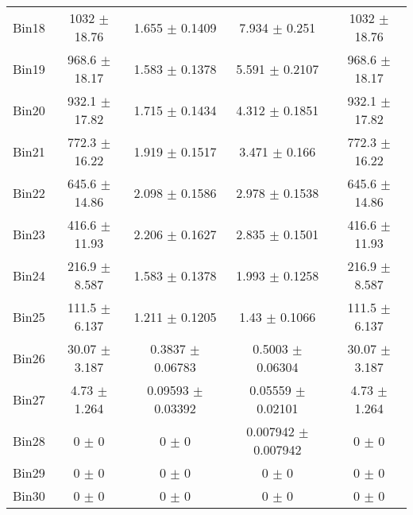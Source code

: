 \begin{tabular}{@{\extracolsep{4pt}}lcccc@{}}
     Bin18 & 1032 $\pm$ 18.76 & 1.655 $\pm$ 0.1409 & 7.934 $\pm$ 0.251 & 1032 $\pm$ 18.76 \\ 
     Bin19 & 968.6 $\pm$ 18.17 & 1.583 $\pm$ 0.1378 & 5.591 $\pm$ 0.2107 & 968.6 $\pm$ 18.17 \\ 
     Bin20 & 932.1 $\pm$ 17.82 & 1.715 $\pm$ 0.1434 & 4.312 $\pm$ 0.1851 & 932.1 $\pm$ 17.82 \\ 
     Bin21 & 772.3 $\pm$ 16.22 & 1.919 $\pm$ 0.1517 & 3.471 $\pm$ 0.166 & 772.3 $\pm$ 16.22 \\ 
     Bin22 & 645.6 $\pm$ 14.86 & 2.098 $\pm$ 0.1586 & 2.978 $\pm$ 0.1538 & 645.6 $\pm$ 14.86 \\ 
     Bin23 & 416.6 $\pm$ 11.93 & 2.206 $\pm$ 0.1627 & 2.835 $\pm$ 0.1501 & 416.6 $\pm$ 11.93 \\ 
     Bin24 & 216.9 $\pm$ 8.587 & 1.583 $\pm$ 0.1378 & 1.993 $\pm$ 0.1258 & 216.9 $\pm$ 8.587 \\ 
     Bin25 & 111.5 $\pm$ 6.137 & 1.211 $\pm$ 0.1205 & 1.43 $\pm$ 0.1066 & 111.5 $\pm$ 6.137 \\ 
     Bin26 & 30.07 $\pm$ 3.187 & 0.3837 $\pm$ 0.06783 & 0.5003 $\pm$ 0.06304 & 30.07 $\pm$ 3.187 \\ 
     Bin27 & 4.73 $\pm$ 1.264 & 0.09593 $\pm$ 0.03392 & 0.05559 $\pm$ 0.02101 & 4.73 $\pm$ 1.264 \\ 
     Bin28 & 0 $\pm$ 0 & 0 $\pm$ 0 & 0.007942 $\pm$ 0.007942 & 0 $\pm$ 0 \\ 
     Bin29 & 0 $\pm$ 0 & 0 $\pm$ 0 & 0 $\pm$ 0 & 0 $\pm$ 0 \\ 
     Bin30 & 0 $\pm$ 0 & 0 $\pm$ 0 & 0 $\pm$ 0 & 0 $\pm$ 0 \\ 
\hline\hline
  \end{tabular}

